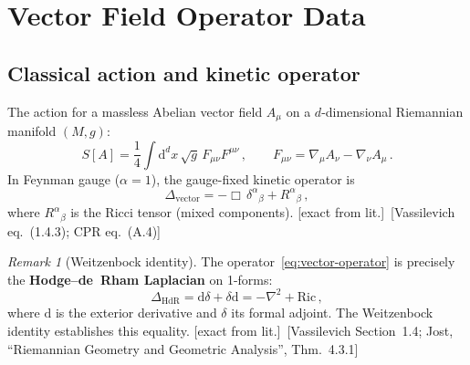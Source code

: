 \documentclass[12pt,a4paper]{article}
\theoremstyle{definition}
\theoremstyle{remark}
\newtheorem{remark}[proposition]{Remark}
\newcommand{\dd}{\mathrm{d}}
\newcommand{\fromlit}[1]{\textcolor{blue!70!black}{\textsf{[#1]}}}
\newcommand{\exactlit}{\textcolor{blue!60!black}{\textsf{[exact from lit.]}}}
\begin{document}
\begin{abstract}
\medskip\noindent
\textbf{Critical result:}
$\beta_W^{(1)} = 1/10$, \textbf{not} $13/120$ as stated in
\texttt{constants.py} (line~81).
The erroneous value $13/120$ arises from subtracting only one ghost
instead of two (ghost + anti-ghost).
See Section~\ref{sec:ghost-subtraction} and Benchmark~B1.
\end{abstract}

\tableofcontents
\newpage


\section{Vector Field Operator Data}
\label{sec:operator-data}

\subsection{Classical action and kinetic operator}

The action for a massless Abelian vector field $A_\mu$ on a
$d$-dimensional Riemannian manifold $(M,g)$:
\begin{equation}
  S[A] = \frac{1}{4}\int \dd^d x\,\sqrt{g}\,
    F_{\mu\nu}F^{\mu\nu}\,,
  \qquad F_{\mu\nu} = \nabla_\mu A_\nu - \nabla_\nu A_\mu\,.
  \label{eq:vector-action}
\end{equation}
In Feynman gauge ($\alpha = 1$), the gauge-fixed kinetic operator is
\begin{equation}
  \Delta_{\mathrm{vector}} = -\Box\,\delta^\alpha{}_\beta
    + R^\alpha{}_\beta\,,
  \label{eq:vector-operator}
\end{equation}
where $R^\alpha{}_\beta$ is the Ricci tensor (mixed components).
\exactlit\ \fromlit{Vassilevich eq.~(1.4.3); CPR eq.~(A.4)}

\begin{remark}[Weitzenbock identity]
The operator~\eqref{eq:vector-operator} is precisely the
\textbf{Hodge--de~Rham Laplacian} on 1-forms:
\begin{equation}
  \Delta_{\mathrm{HdR}} = \dd\delta + \delta\dd
  = -\nabla^2 + \mathrm{Ric}\,,
  \label{eq:hodge-laplacian}
\end{equation}
where $\dd$ is the exterior derivative and $\delta$ its formal adjoint.
The Weitzenbock identity establishes this equality.
\exactlit\ \fromlit{Vassilevich Section~1.4; Jost, ``Riemannian
Geometry and Geometric Analysis'', Thm.~4.3.1}
\end{remark}
\end{document}
